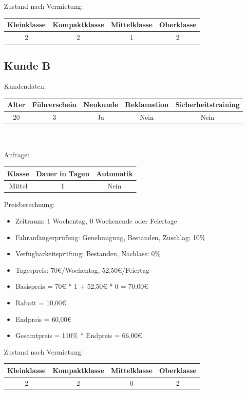 Zustand nach Vermietung:\\
\begin{tabular}{|c|c|c|c|}
	\hline \textbf{Kleinklasse} & \textbf{Kompaktklasse} & \textbf{Mittelklasse} & \textbf{Oberklasse}  \\ 
	\hline 2 & 2 & 1 & 2 \\ 
	\hline 
\end{tabular} 

\subsection{Kunde B}

Kundendaten:\\
\begin{tabular}{|c|c|c|c|c|}
	\hline \textbf{Alter} & \textbf{Führerschein} & \textbf{Neukunde} & \textbf{Reklamation} & \textbf{Sicherheitstraining} \\ 
	\hline 20 & 3 & Ja & Nein & Nein \\ 
	\hline 
\end{tabular} 
\\\\
Anfrage:\\
\begin{tabular}{|c|c|c|}
	\hline \textbf{Klasse} & \textbf{Dauer in Tagen} & \textbf{Automatik} \\ 
	\hline Mittel & 1 & Nein \\ 
	\hline 
\end{tabular}

Preisberechnung:
\begin{itemize}
	\item Zeitraum: 1 Wochentag, 0 Wochenende oder Feiertage
	\item Fahranfängerprüfung: Genehmigung, Bestanden, Zuschlag: 10\%
	\item Verfügbarkeitsprüfung: Bestanden, Nachlass: 0\%
	\item Tagespreis: 70€/Wochentag, 52,50€/Feiertag
	\item Basispreis = 70€ * 1 + 52,50€ * 0 = 70,00€
	\item Rabatt = 10,00€
	\item Endpreis = 60,00€
	\item Gesamtpreis = 110\% * Endpreis = 66,00€
\end{itemize}

Zustand nach Vermietung:\\
\begin{tabular}{|c|c|c|c|}
	\hline \textbf{Kleinklasse} & \textbf{Kompaktklasse} & \textbf{Mittelklasse} & \textbf{Oberklasse}  \\ 
	\hline 2 & 2 & 0 & 2 \\ 
	\hline 
\end{tabular} 

